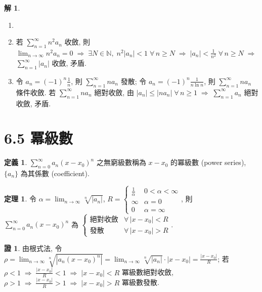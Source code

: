\documentclass[12pt]{extarticle}
\newcommand{\ds}{\displaystyle}
\newcommand{\ie}{\;\Longrightarrow\;}
\theoremstyle{definition}
\newtheorem*{dfn}{定義}
\newtheorem*{thm}{定理}
\newtheorem*{sol}{解}
\newtheorem*{prf}{證}
\newcommand{\myline}{\noindent\makebox[\linewidth]{\rule{\paperwidth}{0.4pt}}}
\begin{document}
\begin{sol}
  \begin{enumerate}\setlength{\itemsep}{0pt}
    \item[]
    \item 若 $\ds\sum_{n = 1}^\infty n^2 a_n$ 收斂, 則 $\ds\lim_{n\to\infty} n^2 a_n = 0 \ie \exists N\in\mathbb{N}, \;n^2 |a_n| < 1\;\forall\,n\geqslant N \ie |a_n| < \frac{1}{n^2}\;\forall\,n\geqslant N \ie$ $\ds\sum_{n = 1}^\infty |a_n|$ 收斂, 矛盾.  
    \item 令 $\ds a_n = (-1)^n\frac{1}{n}$, 則 $\ds\sum_{n = 1}^\infty n a_n$ 發散; 令 $\ds a_n = (-1)^n\frac{1}{n\ln n}$, 則 $\ds\sum_{n = 1}^\infty n a_n$ 條件收斂. 若 $\ds\sum_{n = 1}^\infty n a_n$ 絕對收斂, 由 $\ds|a_n|\leqslant|n a_n|\;\forall\,n\geqslant 1\ie \sum_{n = 1}^\infty a_n$ 絕對收斂, 矛盾. 
  \end{enumerate}
\end{sol}

\myline

\section*{6.5 冪級數}

\begin{dfn}
  $\ds\sum_{n = 0}^\infty a_n (x - x_0)^n$ 之無窮級數稱為 $x - x_0$ 的冪級數 (power series), $\{a_n\}$ 為其係數 (coefficient). 
\end{dfn}

\begin{thm}
  令 $\ds\alpha = \lim_{n\to\infty}\sqrt[n]{|a_n|}$, $\ds R = \begin{cases}\frac{1}{\alpha} & 0 < \alpha < \infty \\ \infty & \alpha = 0 \\ 0 & \alpha = \infty\end{cases}$, 則 $\ds\sum_{n = 0}^\infty a_n (x - x_0)^n$ 為 $\begin{cases}\text{絕對收斂} & \forall\,|x - x_0| < R \\ \text{發散} & \forall\,|x - x_0| > R\end{cases}$. 
\end{thm}

\begin{prf}
  由根式法, 令 $\ds\rho = \lim_{n\to\infty}\sqrt[n]{|a_n(x - x_0)^n|} = \lim_{n\to\infty}\sqrt[n]{|a_n|}\cdot|x - x_0| = \frac{|x - x_0|}{R}$; 若 $\ds\rho < 1 \ie \frac{|x - x_0|}{R} < 1 \ie |x - x_0| < R $ 冪級數絕對收斂, $\ds\rho > 1 \ie \frac{|x - x_0|}{R} > 1 \ie |x - x_0| > R$ 冪級數發散. 
\end{prf}
\end{document}
